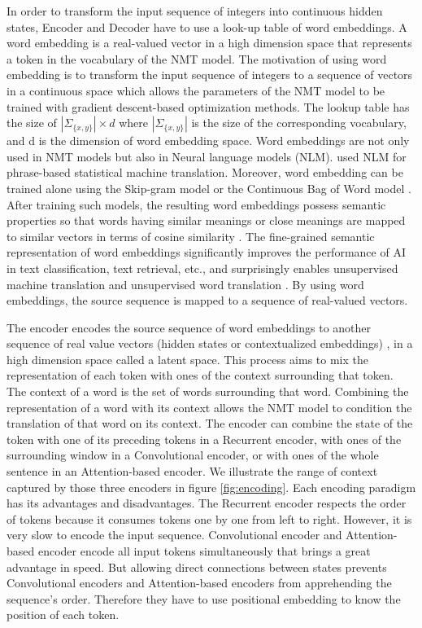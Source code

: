 In order to transform the input sequence of integers into continuous hidden states, Encoder and Decoder have to use a look-up table of word embeddings. A word embedding is a real-valued vector in a high dimension space that represents a token in the vocabulary of the NMT model. The motivation of using word embedding is to transform the input sequence of integers to a sequence of vectors in a continuous space which allows the parameters of the NMT model to be trained with gradient descent-based optimization methods. The lookup table has the size of $|\Sigma_{\{x,y\}}| \times d$ where $|\Sigma_{\{x,y\}}|$ is the size of the corresponding vocabulary, and d is the dimension of word embedding space. Word embeddings are not only used in NMT models but also in Neural language models \citep{Bengio03aneural}(NLM). \citet{Le12continuous, Schwenk12continuous} used NLM for phrase-based statistical machine translation. Moreover, word embedding can be trained alone using the Skip-gram model \citep{Mikolov13distributed} or the Continuous Bag of Word model \citep{Mikolov13efficient}. After training such models, the resulting word embeddings possess semantic properties so that words having similar meanings or close meanings are mapped to similar vectors in terms of cosine similarity \citep{Collobert11natural, Mikolov13distributed, collobert08aunified}. The fine-grained semantic representation of word embeddings significantly improves the performance of AI in text classification, text retrieval, etc., and surprisingly enables unsupervised machine translation and unsupervised word translation  \citep{Pennington14glove,levy15improving,Guillaume18unsupervised,santos20word}. By using word embeddings, the source sequence is mapped to a sequence of real-valued vectors. 

The encoder encodes the source sequence of word embeddings to another sequence of real value vectors (hidden states or contextualized embeddings) \citep{Cho14properties,Bahdanau15learning,Vaswani17attention}, in a high dimension space called a latent space. This process aims to mix the representation of each token with ones of the context surrounding that token. The context of a word is the set of words surrounding that word. Combining the representation of a word with its context allows the NMT model to condition the translation of that word on its context. The encoder can combine the state of the token with one of its preceding tokens in a Recurrent encoder, with ones of the surrounding window in a Convolutional encoder, or with ones of the whole sentence in an Attention-based encoder. We illustrate the range of context captured by those three encoders in figure \ref{fig:encoding}. Each encoding paradigm has its advantages and disadvantages. The Recurrent encoder respects the order of tokens because it consumes tokens one by one from left to right. However, it is very slow to encode the input sequence. Convolutional encoder and Attention-based encoder encode all input tokens simultaneously that brings a great advantage in speed. But allowing direct connections between states prevents Convolutional encoders and Attention-based encoders from apprehending the sequence's order. Therefore they have to use positional embedding to know the position of each token. 

